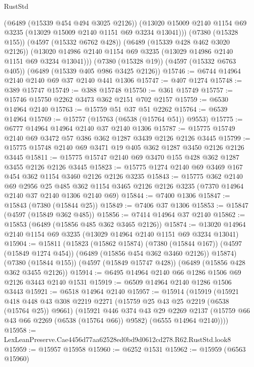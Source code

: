 \begin{lexlean}{RustStd}
\begin{coremodule}
        (@6489 (@15339 @454 @494 @3025 @2126))
        (@13020 @15009 @2140 @1154 @69 @3235 (@13029 @15009 @2140 @1151 @69 @3234 @13041)))
      (@7380 (@15328 @155))
      (@4597 (@15332 @6762 @428))
      (@6489 (@15339 @428 @462 @3020 @2126))
      (@13020 @14986 @2140 @1154 @69 @3235 (@13029 @14986 @2140 @1151 @69 @3234 @13041)))
    (@7380 (@15328 @19))
    (@4597 (@15332 @6763 @405))
    (@6489 (@15339 @405 @986 @3425 @2126))
@15746 := @6744 @14964 @2140 @2140 @69 @37 @2140 @441 @1306
@15747 := @407 @1274
@15748 := @389 @15747
@15749 := @388 @15748
@15750 := @361 @15749
@15757 := @15746 @15750 @2262 @3473 @362 @2151 @702 @2157
@15759 := @6530 @14964 @2140
@15763 := @15759 @51 @37 @51 @2262
@15764 := @6539 @14964
@15769 := @15757 (@15763 (@6538 (@15764 @51)) @9553)
@15775 := @6777 @14964 @14964 @2140 @37 @2140 @1306
@15787 := @15775 @15749 @2140 @69 @3472 @57 @386 @362 @1287 @3439 @2126 @2126 @3445
@15799 := @15775 @15748 @2140 @69 @3471 @19 @405 @362 @1287 @3450 @2126 @2126 @3445
@15811 := @15775 @15747 @2140 @69 @3470 @155 @428 @362 @1287 @3455 @2126 @2126 @3445
@15823 := @15775 @1274 @2140 @69 @3469 @167 @454 @362 @1154 @3460 @2126 @2126 @3235
@15843 := @15775
    @362
    @2140
    @69
    @2956
    @25
    @485
    @362
    @1154
    @3465
    @2126
    @2126
    @3235
    (@7370 @14964 @2140 @37 @2140 @1306 @2140 @69)
@15844 := @7400 @1306
@15847 := @15843 (@7380 (@15844 @25))
@15849 := @7406 @37 @1306
@15853 := @15847 (@4597 (@15849 @362 @485))
@15856 := @7414 @14964 @37 @2140
@15862 := @15853 (@6489 (@15856 @485 @362 @3465 @2126))
@15874 := @13020 @14964 @2140 @1154 @69 @3235 (@13029 @14964 @2140 @1151 @69 @3234 @13041)
@15904 := @15811
    (@15823
      (@15862 @15874)
      (@7380 (@15844 @167))
      (@4597 (@15849 @1274 @454))
      (@6489 (@15856 @454 @362 @3460 @2126))
      @15874)
    (@7380 (@15844 @155))
    (@4597 (@15849 @15747 @428))
    (@6489 (@15856 @428 @362 @3455 @2126))
@15914 := @6495 @14964 @2140 @66 @1286 @1506 @69 @2126 @3443 @2140 @1531
@15919 := @6509 @14964 @2140 @1286 @1506 @3443
@15921 := @6518 @14964 @2140
@15957 := @15914
    (@15919
      (@15921
        @418
        @448
        @43
        @308
        @2219
        @2271
        (@15759 @25 @43 @25 @2219 (@6538 (@15764 @25)) @9661)
        (@15921
          @446
          @374
          @43
          @29
          @2269
          @2137
          (@15759 @66 @43 @66 @2269 (@6538 (@15764 @66)) @9582)
          (@6555 @14964 @2140))))
@15958 := LexLeanPreserve.Cae4456d77aa62528ed0bd9d0612cd278.R62.RustStd.look8
@15959 := @15957 @15958
@15960 := @6252 @1531
@15962 := @15959 (@6563 @15960)

\end{coremodule}
\end{lexlean}
